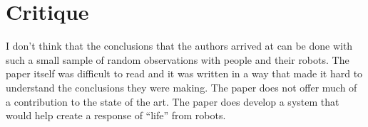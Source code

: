 \documentclass{article}
\begin{document}
\section*{Critique}
I don't think that the conclusions that the authors arrived at can be done with such a small sample of random observations with people and their robots. The paper itself was difficult to read and it was written in a way that made it hard to understand the conclusions they were making. The paper does not offer much of a contribution to the state of the art. The paper does develop a system that would help create a response of ``life'' from robots.
\end{document}
